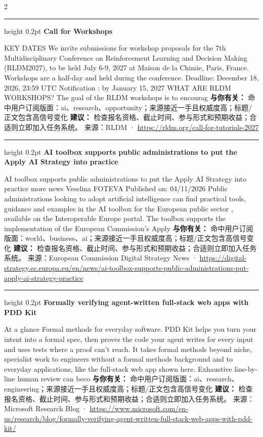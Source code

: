 \documentclass[10.5pt]{ctexart}
\begin{document}
\begin{multicols}{2}
\vspace{2mm}
\hrule height 0.2pt
\vspace{2mm}
{\large\bfseries Call for Workshops}\par
KEY DATES We invite submissions for workshop proposals for the 7th Multidisciplinary Conference on Reinforcement Learning and Decision Making (RLDM2027), to be held July 6-9, 2027 at Maison de la Chimie, Paris, France. Workshops are a half-day and held during the conference. Deadline: December 18, 2026, 23:59 UTC Notification : by January 15, 2027 WHAT ARE RLDM WORKSHOPS? The goal of the RLDM workshops is to encourag
\textbf{与你有关：} 命中用户订阅版面：ai、research、opportunity；来源接近一手且权威度高；标题/正文包含高信号变化
\textbf{建议：} 检查报名资格、截止时间、参与形式和预期收益；合适则立即加入任务系统。
{\footnotesize\color{ormuted} 来源：RLDM · \url{https://rldm.org/call-for-tutorials-2027}}
\vspace{2mm}
\hrule height 0.2pt
\vspace{2mm}
{\large\bfseries AI toolbox supports public administrations to put the Apply AI Strategy into practice}\par
AI toolbox supports public administrations to put the Apply AI Strategy into practice more news Veselina FOTEVA Published on: 04/11/2026 Public administrations looking to adopt artificial intelligence can find practical tools, guidance and examples in the AI toolbox for the European public sector , available on the Interoperable Europe portal. The toolbox supports the implementation of the European Commission’s Apply
\textbf{与你有关：} 命中用户订阅版面：world、business、ai；来源接近一手且权威度高；标题/正文包含高信号变化
\textbf{建议：} 检查报名资格、截止时间、参与形式和预期收益；合适则立即加入任务系统。
{\footnotesize\color{ormuted} 来源：European Commission Digital Strategy News · \url{https://digital-strategy.ec.europa.eu/en/news/ai-toolbox-supports-public-administrations-put-apply-ai-strategy-practice}}
\vspace{2mm}
\hrule height 0.2pt
\vspace{2mm}
{\large\bfseries Formally verifying agent-written full-stack web apps with PDD Kit}\par
At a glance Formal methods for everyday software. PDD Kit helps you turn your intent into a formal spec, then proves the code your agent writes for every input and uses tests where a proof can’t reach. It takes formal methods beyond niche, specialist work to engineers without a formal methods background and to everyday applications, like the full-stack web app shown here. Exhaustive line-by-line human review can beco
\textbf{与你有关：} 命中用户订阅版面：ai、research、engineering；来源接近一手且权威度高；标题/正文包含高信号变化
\textbf{建议：} 检查报名资格、截止时间、参与形式和预期收益；合适则立即加入任务系统。
{\footnotesize\color{ormuted} 来源：Microsoft Research Blog · \url{https://www.microsoft.com/en-us/research/blog/formally-verifying-agent-written-full-stack-web-apps-with-pdd-kit/}}
\end{multicols}
\end{document}
